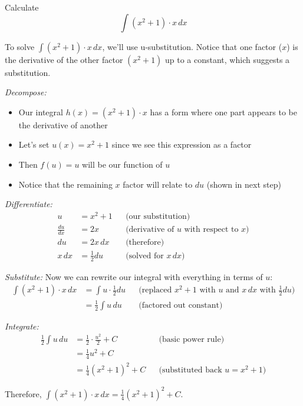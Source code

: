 \documentclass{article}
\begin{document}
  \begin{exercise}
    Calculate 
    \begin{equation}
      \int (x^2 + 1) \cdot x \,dx 
    \end{equation}
  \end{exercise}
  \begin{solution}
    To solve $\int (x^2 + 1) \cdot x \,dx$, we'll use u-substitution. Notice that one factor ($x$) is the derivative of the other factor $(x^2 + 1)$ up to a constant, which suggests a substitution.
    
    \textit{Decompose:}
    \begin{itemize}
      \item Our integral $h(x) = (x^2 + 1) \cdot x$ has a form where one part appears to be the derivative of another
      \item Let's set $u(x) = x^2 + 1$ since we see this expression as a factor
      \item Then $f(u) = u$ will be our function of $u$
      \item Notice that the remaining $x$ factor will relate to $du$ (shown in next step)
    \end{itemize}

    \textit{Differentiate:}
    \begin{align*}
      u &= x^2 + 1 && \text{(our substitution)} \\
      \frac{du}{dx} &= 2x && \text{(derivative of $u$ with respect to $x$)} \\
      du &= 2x\,dx && \text{(therefore)} \\
      x\,dx &= \frac{1}{2}du && \text{(solved for $x\,dx$)}
    \end{align*}

    \textit{Substitute:}
    Now we can rewrite our integral with everything in terms of $u$:
    \begin{align*}
      \int (x^2 + 1) \cdot x \,dx &= \int u \cdot \frac{1}{2}du && \text{(replaced $x^2 + 1$ with $u$ and $x\,dx$ with $\frac{1}{2}du$)} \\
      &= \frac{1}{2}\int u \,du && \text{(factored out constant)}
    \end{align*}

    \textit{Integrate:}
    \begin{align*}
      \frac{1}{2}\int u \,du &= \frac{1}{2} \cdot \frac{u^2}{2} + C && \text{(basic power rule)} \\
      &= \frac{1}{4}u^2 + C \\
      &= \frac{1}{4}(x^2 + 1)^2 + C && \text{(substituted back $u = x^2 + 1$)}
    \end{align*}

    Therefore, $\int (x^2 + 1) \cdot x \,dx = \frac{1}{4}(x^2 + 1)^2 + C$.
  \end{solution}
\end{document}

